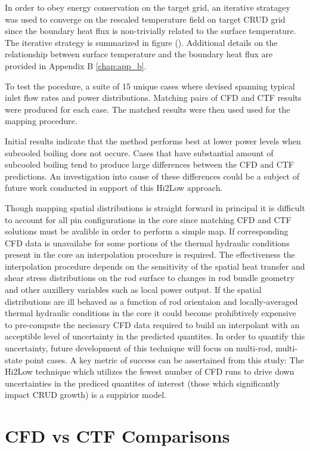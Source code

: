 In order to obey energy conservation on the target grid,  an iterative stratagey was used to converge on the rescaled temperature field on target CRUD grid since the boundary heat flux is non-trivially related to the surface temperature.  The iterative strategy is summarized in figure (). 
Additional details on the relationship between surface temperature and the boundary heat flux are provided in Appendix B \ref{chap:app_b}.

To test the pocedure, a suite of 15 unique cases where devised spanning typical inlet flow rates and power distributions.  Matching pairs of CFD and CTF results were produced for each case.  The matched results were then used used for the mapping procedure.

Initial results indicate that the method performs best at lower power levels when subcooled boiling does not occure.  Cases that have substantial amount of subcooled boiling tend to produce large differences between the CFD and CTF predictions.  An investigation into cause of these differences could be a subject of future work conducted in support of this Hi2Low approach.  

Though mapping spatial distributions is straight forward in principal it is difficult to account for all pin configurations in the core since matching CFD and CTF solutions must be avalible in order to perform a simple map.  If corresponding CFD data is unavailabe for some portions of the thermal hydraulic conditions present in the core an interpolation procedure is required.  The effectiveness the interpolation procedure depends on the sensitivity of the spatial heat transfer and shear stress distributions on the rod surface to changes in rod bundle geometry and other auxillery variables such as local power output.  If the spatial distributions are ill behaved as a function of rod orientaion and locally-averaged thermal hydraulic conditions in the core it could become prohibtively expensive to pre-compute the necissary CFD data required to build an interpolant with an acceptible level of uncertainty in the predicted quantites.  In order to quantify this uncertainty, future development of this technique will focus on multi-rod, multi-state point cases.
A key metric of success can be assertained from this study:  The Hi2Low technique which utilizes the fewest number of CFD runs to drive down uncertainties in the prediced quantites of interest (those which significantly impact CRUD growth) is a suppirior model.


\section{CFD vs CTF Comparisons}


